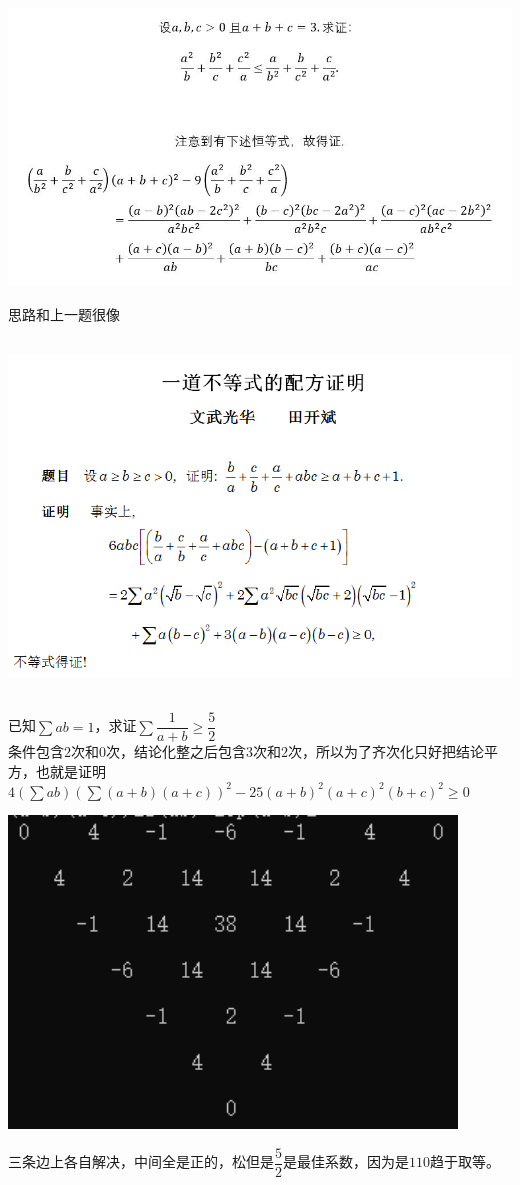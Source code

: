 \documentclass[UTF8]{ctexart}
\begin{document}
\subsection{}
\begin{center}
	\includegraphics[width=1\linewidth]{a19}
\end{center}
思路和上一题很像
\subsection{}
\begin{center}
	\includegraphics[width=0.8\linewidth]{a39}
\end{center}
\subsection{}
已知$ \displaystyle \sum ab=1$，求证$ \displaystyle \sum \dfrac{1}{a+b}\geq \dfrac{5}{2}$\\
条件包含$ 2 $次和$ 0 $次，结论化整之后包含$ 3 $次和$ 2 $次，所以为了齐次化只好把结论平方，也就是证明$
4(\displaystyle \sum ab)(\displaystyle \sum (a+b)(a+c))^{2}-25(a+b)^{2}(a+c)^{2}(b+c)^{2}≥0 $
\begin{center}
	\includegraphics[width=0.5\linewidth]{a24}
\end{center}
三条边上各自解决，中间全是正的，松但是$ \dfrac{5}{2} $是最佳系数，因为是$ 110 $趋于取等。
\end{document}
